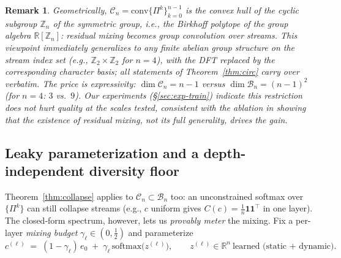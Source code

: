 \documentclass[11pt]{article}
\newtheorem{remark}{Remark}
\newcommand{\R}{\mathbb{R}}
\newcommand{\ones}{\mathbf{1}}
\newcommand{\J}{\tfrac{1}{n}\ones\ones^{\!\top}}
\begin{document}
\begin{remark}
Geometrically, $\mathcal{C}_n=\mathrm{conv}\{\Pi^k\}_{k=0}^{n-1}$ is the convex hull of the cyclic subgroup $\mathbb{Z}_n$ of the symmetric group, i.e., the Birkhoff polytope of the group algebra $\R[\mathbb{Z}_n]$: residual mixing becomes \emph{group convolution over streams}. This viewpoint immediately generalizes to any finite abelian group structure on the stream index set (e.g., $\mathbb{Z}_2\times\mathbb{Z}_2$ for $n=4$), with the DFT replaced by the corresponding character basis; all statements of Theorem~\ref{thm:circ} carry over verbatim. The price is expressivity: $\dim\mathcal{C}_n=n-1$ versus $\dim\mathcal{B}_n=(n-1)^2$ (for $n=4$: $3$ vs.\ $9$). Our experiments (\S\ref{sec:exp-train}) indicate this restriction does not hurt quality at the scales tested, consistent with the ablation in \citep{xie2025mhc} showing that the \emph{existence} of residual mixing, not its full generality, drives the gain.
\end{remark}

\subsection{Leaky parameterization and a depth-independent diversity floor}

Theorem~\ref{thm:collapse} applies to $\mathcal{C}_n\subset\mathcal{B}_n$ too: an unconstrained softmax over $\{\Pi^k\}$ can still collapse streams (e.g., $c$ uniform gives $C(c)=\J$ in one layer). The closed-form spectrum, however, lets us \emph{provably meter} the mixing. Fix a per-layer \emph{mixing budget} $\gamma_\ell\in(0,\tfrac12)$ and parameterize
\begin{equation}
c^{(\ell)}\;=\;(1-\gamma_\ell)\,e_0\;+\;\gamma_\ell\,\mathrm{softmax}\big(z^{(\ell)}\big),
\qquad z^{(\ell)}\in\R^{n}\ \text{learned (static + dynamic).}
\label{eq:leaky}
\end{equation}
\end{document}
